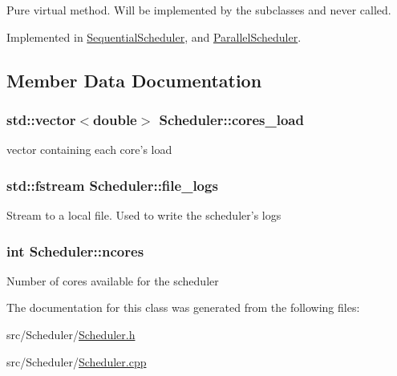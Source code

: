 Pure virtual method. Will be implemented by the subclasses and never called. 



Implemented in \hyperlink{classSequentialScheduler_a9603767b779a4612f02ac85bc4c49bf6}{Sequential\-Scheduler}, and \hyperlink{classParallelScheduler_aef0d5f1091857170434687897d19843e}{Parallel\-Scheduler}.



\subsection{Member Data Documentation}
\hypertarget{classScheduler_a6f6825fef1ef0a243ebd42751f2186f9}{
\subsubsection[{cores\-\_\-load}]{\setlength{\rightskip}{0pt plus 5cm}std\-::vector$<$double$>$ Scheduler\-::cores\-\_\-load\hspace{0.3cm}{\ttfamily [protected]}}}\label{classScheduler_a6f6825fef1ef0a243ebd42751f2186f9}
vector containing each core's load \hypertarget{classScheduler_aaa404121f2a46a4012fc6b11374dae29}{
\subsubsection[{file\-\_\-logs}]{\setlength{\rightskip}{0pt plus 5cm}std\-::fstream Scheduler\-::file\-\_\-logs\hspace{0.3cm}{\ttfamily [protected]}}}\label{classScheduler_aaa404121f2a46a4012fc6b11374dae29}
Stream to a local file. Used to write the scheduler's logs \hypertarget{classScheduler_ac2ae53ef390e5372fdfb9c850f91d0c7}{
\subsubsection[{ncores}]{\setlength{\rightskip}{0pt plus 5cm}int Scheduler\-::ncores\hspace{0.3cm}{\ttfamily [private]}}}\label{classScheduler_ac2ae53ef390e5372fdfb9c850f91d0c7}
Number of cores available for the scheduler 

The documentation for this class was generated from the following files\-:\begin{DoxyCompactItemize}
\item 
src/\-Scheduler/\hyperlink{Scheduler_8h}{Scheduler.\-h}\item 
src/\-Scheduler/\hyperlink{Scheduler_8cpp}{Scheduler.\-cpp}\end{DoxyCompactItemize}
